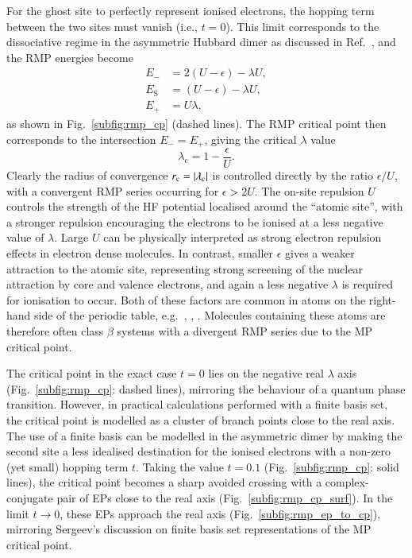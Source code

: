 \documentclass[aps,prb,reprint,noshowkeys,superscriptaddress]{revtex4-1}
\newcommand{\latin}[1]{#1}
\newcommand{\ie}{\latin{i.e.}}
\newcommand{\eg}{\latin{e.g.}}
\newcommand{\rc}{r_{\text{c}}}
\newcommand{\lc}{\lambda_{\text{c}}}
\begin{document}
For the ghost site to perfectly represent ionised electrons, the hopping term between the two sites must vanish (\ie, $t=0$).
This limit corresponds to the dissociative regime in the asymmetric Hubbard dimer as discussed in Ref.~, 
and the RMP energies become
\begin{subequations}
\begin{align}
    E_{-} &= 2(U - \epsilon) - \lambda U,
    \\
    E_{\text{S}} &= (U - \epsilon) - \lambda U,
    \\ 
    E_{+} &= U \lambda,
\end{align}
\end{subequations}
as shown in Fig.~\ref{subfig:rmp_cp} (dashed lines).
The RMP critical point then corresponds to the intersection $E_{-} = E_{+}$, giving the critical $\lambda$ value
\begin{equation}
    \lc = 1 - \frac{\epsilon}{U}. 
\end{equation}
Clearly the radius of convergence $\rc = \abs{\lc}$ is controlled directly by the ratio $\epsilon / U$, 
with a convergent RMP series occurring for $\epsilon > 2 U$.
The on-site repulsion $U$ controls the strength of the HF potential localised around the ``atomic site'', with a
stronger repulsion encouraging the electrons to be ionised at a less negative value of $\lambda$. 
Large $U$ can be physically interpreted as strong electron repulsion effects in electron dense molecules. 
In contrast, smaller $\epsilon$ gives a weaker attraction to the atomic site, 
representing strong screening of the nuclear attraction by core and valence electrons, 
and again a less negative $\lambda$ is required for ionisation to occur.
Both of these factors are common in atoms on the right-hand side of the periodic table, \eg\ ,
, .
Molecules containing these atoms are therefore often class $\beta$ systems with
a divergent RMP series due to the MP critical point. \cite{Goodson_2004,Sergeev_2006} 

The critical point in the exact case $t=0$ lies on the negative real $\lambda$ axis (Fig.~\ref{subfig:rmp_cp}: dashed lines), 
mirroring the behaviour of a quantum phase transition.\cite{Kais_2006}
However, in practical calculations performed with a finite basis set, the critical point is modelled as a cluster
of branch points close to the real axis.
The use of a finite basis can be modelled in the asymmetric dimer by making the second site a less
idealised destination for the ionised electrons with a non-zero (yet small) hopping term $t$.
Taking the value $t=0.1$ (Fig.~\ref{subfig:rmp_cp}: solid lines), the critical point becomes a
sharp avoided crossing with a complex-conjugate pair of EPs close to the real axis (Fig.~\ref{subfig:rmp_cp_surf}).
In the limit $t \to 0$, these EPs approach the real axis (Fig.~\ref{subfig:rmp_ep_to_cp}),
mirroring Sergeev's discussion on finite basis
set representations of the MP critical point.\cite{Sergeev_2006}
\end{document}
